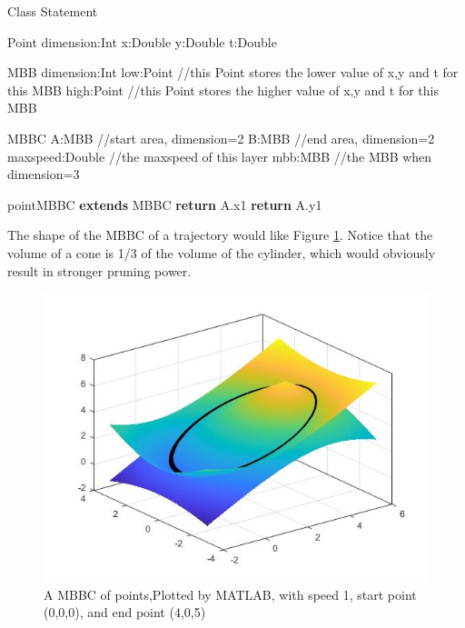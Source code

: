 \documentclass[sigplan]{acmart}
\begin{document}
\begin{algorithm}[ht]
\caption{Class Statement} \label{alg:class}



\begin{algorithmic}[0]
\Ensure Point
    \State dimension:Int
    \State x:Double
    \State y:Double
    \State t:Double

\Ensure MBB
    \State dimension:Int
    \State low:Point //this Point stores the lower value of x,y and t for this MBB
    \State high:Point //this Point stores the higher value of x,y and t for this MBB

\Ensure MBBC
    \State A:MBB //start area, dimension=2
    \State B:MBB //end area, dimension=2
    \State maxspeed:Double //the maxspeed of this layer
    \State mbb:MBB //the MBB when dimension=3

\Ensure pointMBBC \textbf{extends} MBBC
    \State \textbf{return} A.x1
    \EndFunction
    \State \textbf{return} A.y1
    \EndFunction
\end{algorithmic}
\end{algorithm}

The shape of the MBBC of a trajectory would like Figure \ref{fig:matlab}. Notice that the volume of a cone is 1/3 of the volume of the cylinder, which would obviously result in stronger pruning power.\\
\begin{figure}[ht]
  \centering
  \includegraphics[width=\linewidth]{matlab.jpg}
  \caption{A MBBC of points,Plotted by MATLAB, with speed 1, start point (0,0,0), and end point (4,0,5)}
  \label{fig:matlab}
\end{figure}
\end{document}
